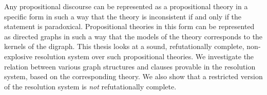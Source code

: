 Any propositional discourse can be represented as a propositional theory in a specific form in such a way that the theory is inconsistent if and only if the statement is paradoxical.
Propositional theories in this form can be represented as directed graphs in such a way that the models of the theory corresponds to the kernels of the digraph.
This thesis looks at a sound, refutationally complete, non-explosive resolution system over such propositional theories.
We investigate the relation between various graph structures and clauses provable in the resolution system, based on the corresponding theory.
We also show that a restricted version of the resolution system is \textit{not} refutationally complete.
